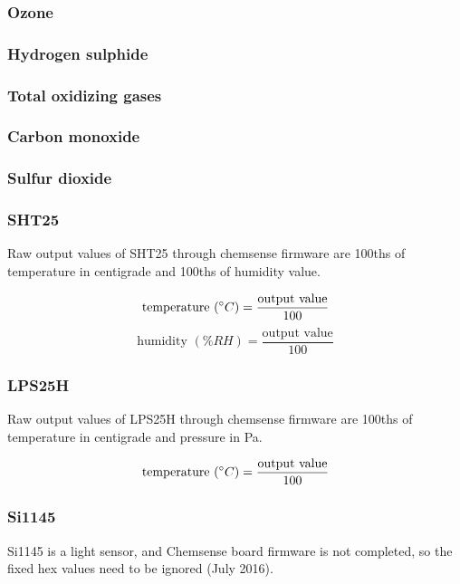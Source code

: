 \subsubsection{ Ozone}

\subsubsection{ Hydrogen sulphide}

\subsubsection{ Total oxidizing gases}

\subsubsection{ Carbon monoxide}

\subsubsection{ Sulfur dioxide}

\subsubsection{ SHT25}

Raw output values of SHT25 through chemsense firmware are 100ths of temperature in centigrade and 100ths of humidity value.

{\centering
 \[ \text{temperature }(\degree C) = \frac{\text{output value}}{100} \]
 \[ \text{humidity }(\% RH) = \frac{\text{output value}}{100} \]
 \par
 }

\subsubsection{ LPS25H}

Raw output values of LPS25H through chemsense firmware are 100ths of temperature in centigrade and pressure in Pa.

{\centering 
 \[ \text{temperature }(\degree C) = \frac{\text{output value}}{100} \]
}

\subsubsection{ Si1145}

Si1145 is a light sensor, and Chemsense board firmware is not completed, so the fixed hex values need to be ignored (July 2016).

